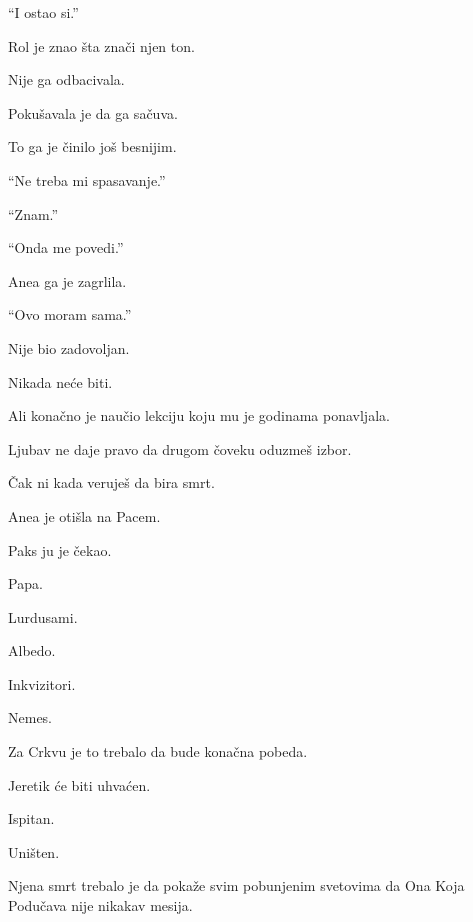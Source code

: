 ``I ostao si.''

\bigskip

Rol je znao šta znači njen ton.

\bigskip

Nije ga odbacivala.

Pokušavala je da ga sačuva.

\bigskip

To ga je činilo još besnijim.

\bigskip

``Ne treba mi spasavanje.''

``Znam.''

``Onda me povedi.''

\bigskip

Anea ga je zagrlila.

\bigskip

``Ovo moram sama.''

\bigskip

Nije bio zadovoljan.

Nikada neće biti.

\bigskip

Ali konačno je naučio lekciju koju mu je godinama ponavljala.

\bigskip

Ljubav ne daje pravo da drugom čoveku oduzmeš izbor.

\bigskip

Čak ni kada veruješ da bira smrt.

\bigskip

Anea je otišla na Pacem.

\bigskip

Paks ju je čekao.

\bigskip

Papa.

Lurdusami.

Albedo.

Inkvizitori.

Nemes.

\bigskip

Za Crkvu je to trebalo da bude konačna pobeda.

\bigskip

Jeretik će biti uhvaćen.

Ispitan.

Uništen.

\bigskip

Njena smrt trebalo je da pokaže svim pobunjenim svetovima da Ona Koja Podučava nije nikakav mesija.

\bigskip

